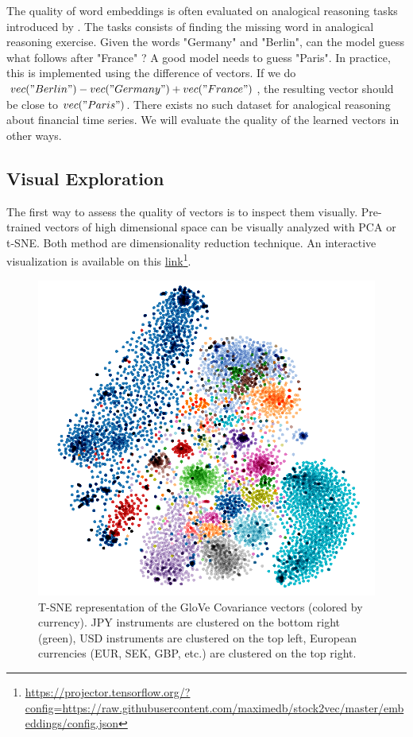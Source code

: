 \documentclass[a4paper, 11pt]{article}
\begin{document}
The quality of word embeddings is often evaluated on analogical reasoning tasks introduced by \cite{DBLP:journals/corr/abs-1301-3781}. The tasks consists of finding the missing word in analogical reasoning exercise. Given the words "Germany" and "Berlin", can the model guess what follows after "France" ? A good model needs to guess "Paris". In practice, this is implemented using the difference of vectors. If we do \(vec("Berlin") - vec("Germany") + vec("France")\), the resulting vector should be close to \(vec("Paris")\). There exists no such dataset for analogical reasoning about financial time series. We will evaluate the quality of the learned vectors in other ways.

\subsection{Visual Exploration}
The first way to assess the quality of vectors is to inspect them visually. Pre-trained vectors of high dimensional space can be visually analyzed with PCA or t-SNE. Both method are dimensionality reduction technique. An interactive visualization is available on this \href{https://projector.tensorflow.org/?config=https://raw.githubusercontent.com/maximedb/stock2vec/master/embeddings/config.json}{link}\footnote{\url{https://projector.tensorflow.org/?config=https://raw.githubusercontent.com/maximedb/stock2vec/master/embeddings/config.json}}.

\begin{figure}[h]
\centering
\includegraphics[scale=0.33]{tsne_glove_cov.PNG}
\caption{T-SNE representation of the GloVe Covariance vectors (colored by currency). JPY instruments are clustered on the bottom right (green), USD instruments are clustered on the top left, European currencies (EUR, SEK, GBP, etc.) are clustered on the top right.}
\end{figure}
\end{document}
